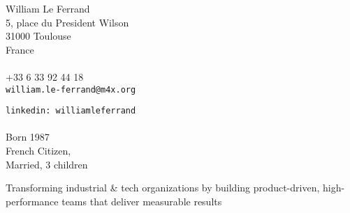 \documentclass{cv}
\begin{document}
\begin{chapeau}
\begin{adresse}
	William Le Ferrand\\%
	5, place du President Wilson\\%
	31000 Toulouse\\%
        France\\%
	\ligne\\%
        +33 6 33 92 44 18\\%
	\texttt{william.le-ferrand@m4x.org}
\end{adresse}
\begin{etatcivil}
  \texttt{linkedin: williamleferrand}\\%
  \ligne\\%
  Born 1987\\
  French Citizen,\\
  Married, 3 children
\end{etatcivil}
\end{chapeau}

\vspace{4mm}
\begin{center}
Transforming industrial & tech organizations by building product-driven, high-performance teams that deliver measurable results
\end{center}
\vspace{2mm}

\end{document}
